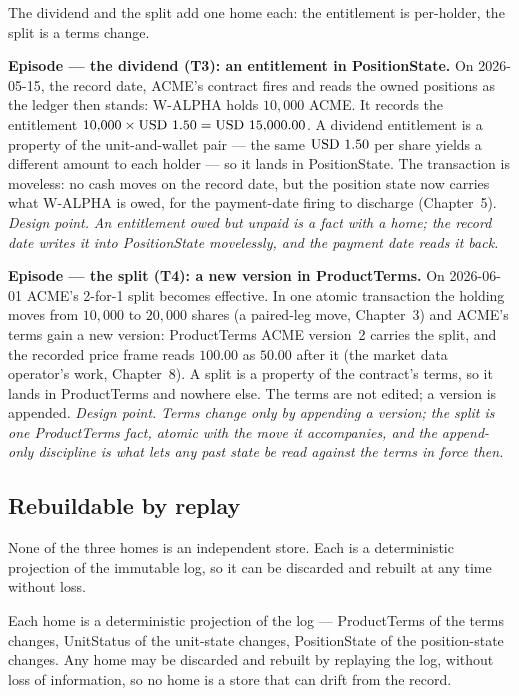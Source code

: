 The dividend and the split add one home each: the entitlement is per-holder, the split is a
terms change.

\medskip\noindent\textbf{Episode --- the dividend (T3): an entitlement in PositionState.}
On 2026-05-15, the record date, ACME's contract fires and reads the owned positions as the
ledger then stands: W-ALPHA holds $10{,}000$ ACME. It records the entitlement
$10{,}000\times\mbox{USD~1.50}=\mbox{USD~15{,}000.00}$. A dividend entitlement is a property of the
unit-and-wallet pair --- the same $\mbox{USD~1.50}$ per share yields a different amount to each
holder --- so it lands in PositionState. The transaction is moveless: no cash moves on the
record date, but the position state now carries what W-ALPHA is owed, for the payment-date
firing to discharge (Chapter~5).
\emph{Design point.} \emph{An entitlement owed but unpaid is a fact with a home; the record
date writes it into PositionState movelessly, and the payment date reads it back.}

\medskip\noindent\textbf{Episode --- the split (T4): a new version in ProductTerms.}
On 2026-06-01 ACME's 2-for-1 split becomes effective. In one atomic transaction the holding
moves from $10{,}000$ to $20{,}000$ shares (a paired-leg move, Chapter~3) and
ACME's terms gain a new version: ProductTerms ACME version~2 carries the split, and the
recorded price frame reads $100.00$ as $50.00$ after it (the market data operator's work,
Chapter~8). A split is a property of the contract's terms, so
it lands in ProductTerms and nowhere else. The terms are not edited; a version is appended.
\emph{Design point.} \emph{Terms change only by appending a version; the split is one
ProductTerms fact, atomic with the move it accompanies, and the append-only discipline is
what lets any past state be read against the terms in force then.}

\subsection{Rebuildable by replay}

None of the three homes is an independent store. Each is a deterministic projection of the
immutable log, so it can be discarded and rebuilt at any time without loss.

\begin{principle}\label{prin:rebuildable}
Each home is a deterministic projection of the log --- ProductTerms of the terms changes,
UnitStatus of the unit-state changes, PositionState of the position-state changes. Any
home may be discarded and rebuilt by replaying the log, without loss of information, so no
home is a store that can drift from the record.
\end{principle}


